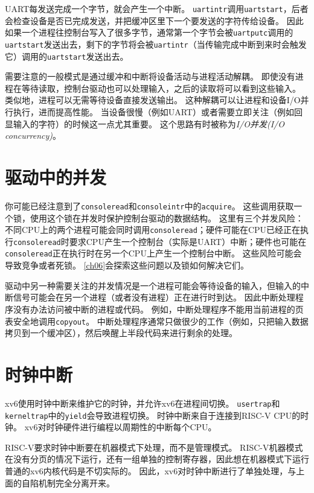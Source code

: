 UART每发送完成一个字节，就会产生一个中断。
\texttt{uartintr}调用\texttt{uartstart}，后者会检查设备是否已完成发送，并把缓冲区里下一个要发送的字符传给设备。
因此如果一个进程往控制台写入了很多字节，通常第一个字节会被\texttt{uartputc}调用的\texttt{uartstart}发送出去，剩下的字节将会被\texttt{uartintr}（当传输完成中断到来时会触发它）调用的\texttt{uartstart}发送出去。

需要注意的一般模式是通过缓冲和中断将设备活动与进程活动解耦。
即使没有进程在等待读取，控制台驱动也可以处理输入，之后的读取将可以看到这些输入。
类似地，进程可以无需等待设备直接发送输出。
这种解耦可以让进程和设备I/O并行执行，进而提高性能。
当设备很慢（例如UART）或者需要立即关注（例如回显输入的字符）的时候这一点尤其重要。
这个思路有时被称为\emph{I/O并发(I/O concurrency)}。

\section{驱动中的并发}
你可能已经注意到了\texttt{consoleread}和\texttt{consoleintr}中的\texttt{acquire}。
这些调用获取一个锁，使用这个锁在并发时保护控制台驱动的数据结构。
这里有三个并发风险：不同CPU上的两个进程可能会同时调用\texttt{consoleread}；硬件可能在CPU已经正在执行\texttt{consoleread}时要求CPU产生一个控制台（实际是UART）中断；硬件也可能在\texttt{consoleread}正在执行时在另一个CPU上产生一个控制台中断。
这些风险可能会导致竞争或者死锁。
\autoref{ch06}会探索这些问题以及锁如何解决它们。

驱动中另一种需要关注的并发情况是一个进程可能会等待设备的输入，但输入的中断信号可能会在另一个进程（或者没有进程）正在进行时到达。
因此中断处理程序没有办法访问被中断的进程或代码。
例如，中断处理程序不能用当前进程的页表安全地调用\texttt{copyout}。
中断处理程序通常只做很少的工作（例如，只把输入数据拷贝到一个缓冲区），然后唤醒上半段代码来进行剩余的处理。

\section{时钟中断}
xv6使用时钟中断来维护它的时钟，并允许xv6在进程间切换。
\texttt{usertrap}和\texttt{kerneltrap}中的\texttt{yield}会导致进程切换。
时钟中断来自于连接到RISC-V CPU的时钟。
xv6对时钟硬件进行编程以周期性的中断每个CPU。

RISC-V要求时钟中断要在机器模式下处理，而不是管理模式。
RISC-V机器模式在没有分页的情况下运行，还有一组单独的控制寄存器，因此想在机器模式下运行普通的xv6内核代码是不切实际的。
因此，xv6对时钟中断进行了单独处理，与上面的自陷机制完全分离开来。

